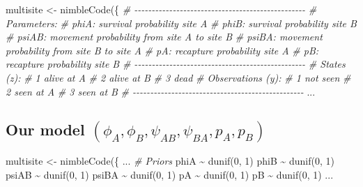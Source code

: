 \documentclass[
  12pt,
]{krantz}
\newenvironment{Shaded}{\begin{snugshade}}{\end{snugshade}}
\newcommand{\CommentTok}[1]{\textcolor[rgb]{0.56,0.35,0.01}{\textit{#1}}}
\newcommand{\DecValTok}[1]{\textcolor[rgb]{0.00,0.00,0.81}{#1}}
\newcommand{\FunctionTok}[1]{\textcolor[rgb]{0.00,0.00,0.00}{#1}}
\newcommand{\NormalTok}[1]{#1}
\newcommand{\OtherTok}[1]{\textcolor[rgb]{0.56,0.35,0.01}{#1}}
\newcommand{\SpecialCharTok}[1]{\textcolor[rgb]{0.00,0.00,0.00}{#1}}
\begin{document}
\begin{Shaded}
\begin{Highlighting}[]
\NormalTok{multisite }\OtherTok{\textless{}{-}} \FunctionTok{nimbleCode}\NormalTok{(\{}
  \CommentTok{\# {-}{-}{-}{-}{-}{-}{-}{-}{-}{-}{-}{-}{-}{-}{-}{-}{-}{-}{-}{-}{-}{-}{-}{-}{-}{-}{-}{-}{-}{-}{-}{-}{-}{-}{-}{-}{-}{-}{-}{-}{-}{-}{-}{-}{-}{-}{-}{-}{-}}
  \CommentTok{\# Parameters:}
  \CommentTok{\# phiA: survival probability site A}
  \CommentTok{\# phiB: survival probability site B}
  \CommentTok{\# psiAB: movement probability from site A to site B}
  \CommentTok{\# psiBA: movement probability from site B to site A}
  \CommentTok{\# pA: recapture probability site A}
  \CommentTok{\# pB: recapture probability site B}
  \CommentTok{\# {-}{-}{-}{-}{-}{-}{-}{-}{-}{-}{-}{-}{-}{-}{-}{-}{-}{-}{-}{-}{-}{-}{-}{-}{-}{-}{-}{-}{-}{-}{-}{-}{-}{-}{-}{-}{-}{-}{-}{-}{-}{-}{-}{-}{-}{-}{-}{-}{-}}
  \CommentTok{\# States (z):}
  \CommentTok{\# 1 alive at A}
  \CommentTok{\# 2 alive at B}
  \CommentTok{\# 3 dead}
  \CommentTok{\# Observations (y):}
  \CommentTok{\# 1 not seen}
  \CommentTok{\# 2 seen at A}
  \CommentTok{\# 3 seen at B}
  \CommentTok{\# {-}{-}{-}{-}{-}{-}{-}{-}{-}{-}{-}{-}{-}{-}{-}{-}{-}{-}{-}{-}{-}{-}{-}{-}{-}{-}{-}{-}{-}{-}{-}{-}{-}{-}{-}{-}{-}{-}{-}{-}{-}{-}{-}{-}{-}{-}{-}{-}{-}}
\NormalTok{...}
\end{Highlighting}
\end{Shaded}

\hypertarget{our-model-phi_a-phi_b-psi_ab-psi_ba-p_a-p_b-1}{%
\subsection{\texorpdfstring{Our model \((\phi_A, \phi_B, \psi_{AB}, \psi_{BA}, p_A, p_B)\)}{Our model (\textbackslash phi\_A, \textbackslash phi\_B, \textbackslash psi\_\{AB\}, \textbackslash psi\_\{BA\}, p\_A, p\_B)}}\label{our-model-phi_a-phi_b-psi_ab-psi_ba-p_a-p_b-1}}

\begin{Shaded}
\begin{Highlighting}[]
\NormalTok{multisite }\OtherTok{\textless{}{-}} \FunctionTok{nimbleCode}\NormalTok{(\{}
\NormalTok{...}
  \CommentTok{\# Priors}
\NormalTok{  phiA }\SpecialCharTok{\textasciitilde{}} \FunctionTok{dunif}\NormalTok{(}\DecValTok{0}\NormalTok{, }\DecValTok{1}\NormalTok{)}
\NormalTok{  phiB }\SpecialCharTok{\textasciitilde{}} \FunctionTok{dunif}\NormalTok{(}\DecValTok{0}\NormalTok{, }\DecValTok{1}\NormalTok{)}
\NormalTok{  psiAB }\SpecialCharTok{\textasciitilde{}} \FunctionTok{dunif}\NormalTok{(}\DecValTok{0}\NormalTok{, }\DecValTok{1}\NormalTok{)}
\NormalTok{  psiBA }\SpecialCharTok{\textasciitilde{}} \FunctionTok{dunif}\NormalTok{(}\DecValTok{0}\NormalTok{, }\DecValTok{1}\NormalTok{)}
\NormalTok{  pA }\SpecialCharTok{\textasciitilde{}} \FunctionTok{dunif}\NormalTok{(}\DecValTok{0}\NormalTok{, }\DecValTok{1}\NormalTok{)}
\NormalTok{  pB }\SpecialCharTok{\textasciitilde{}} \FunctionTok{dunif}\NormalTok{(}\DecValTok{0}\NormalTok{, }\DecValTok{1}\NormalTok{)}
\NormalTok{...}
\end{Highlighting}
\end{Shaded}
\end{document}
